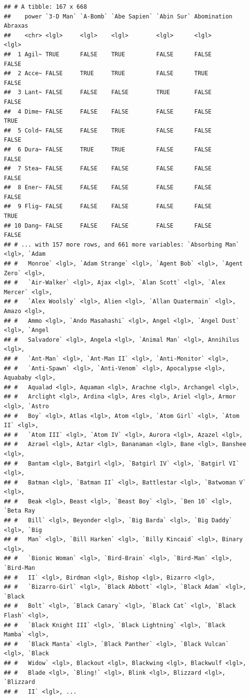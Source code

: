 \documentclass[]{book}
\begin{document}
\begin{verbatim}
## # A tibble: 167 x 668
##    power `3-D Man` `A-Bomb` `Abe Sapien` `Abin Sur` Abomination Abraxas
##    <chr> <lgl>     <lgl>    <lgl>        <lgl>      <lgl>       <lgl>  
##  1 Agil~ TRUE      FALSE    TRUE         FALSE      FALSE       FALSE  
##  2 Acce~ FALSE     TRUE     TRUE         FALSE      TRUE        FALSE  
##  3 Lant~ FALSE     FALSE    FALSE        TRUE       FALSE       FALSE  
##  4 Dime~ FALSE     FALSE    FALSE        FALSE      FALSE       TRUE   
##  5 Cold~ FALSE     FALSE    TRUE         FALSE      FALSE       FALSE  
##  6 Dura~ FALSE     TRUE     TRUE         FALSE      FALSE       FALSE  
##  7 Stea~ FALSE     FALSE    FALSE        FALSE      FALSE       FALSE  
##  8 Ener~ FALSE     FALSE    FALSE        FALSE      FALSE       FALSE  
##  9 Flig~ FALSE     FALSE    FALSE        FALSE      FALSE       TRUE   
## 10 Dang~ FALSE     FALSE    FALSE        FALSE      FALSE       FALSE  
## # ... with 157 more rows, and 661 more variables: `Absorbing Man` <lgl>, `Adam
## #   Monroe` <lgl>, `Adam Strange` <lgl>, `Agent Bob` <lgl>, `Agent Zero` <lgl>,
## #   `Air-Walker` <lgl>, Ajax <lgl>, `Alan Scott` <lgl>, `Alex Mercer` <lgl>,
## #   `Alex Woolsly` <lgl>, Alien <lgl>, `Allan Quatermain` <lgl>, Amazo <lgl>,
## #   Ammo <lgl>, `Ando Masahashi` <lgl>, Angel <lgl>, `Angel Dust` <lgl>, `Angel
## #   Salvadore` <lgl>, Angela <lgl>, `Animal Man` <lgl>, Annihilus <lgl>,
## #   `Ant-Man` <lgl>, `Ant-Man II` <lgl>, `Anti-Monitor` <lgl>,
## #   `Anti-Spawn` <lgl>, `Anti-Venom` <lgl>, Apocalypse <lgl>, Aquababy <lgl>,
## #   Aqualad <lgl>, Aquaman <lgl>, Arachne <lgl>, Archangel <lgl>,
## #   Arclight <lgl>, Ardina <lgl>, Ares <lgl>, Ariel <lgl>, Armor <lgl>, `Astro
## #   Boy` <lgl>, Atlas <lgl>, Atom <lgl>, `Atom Girl` <lgl>, `Atom II` <lgl>,
## #   `Atom III` <lgl>, `Atom IV` <lgl>, Aurora <lgl>, Azazel <lgl>,
## #   Azrael <lgl>, Aztar <lgl>, Bananaman <lgl>, Bane <lgl>, Banshee <lgl>,
## #   Bantam <lgl>, Batgirl <lgl>, `Batgirl IV` <lgl>, `Batgirl VI` <lgl>,
## #   Batman <lgl>, `Batman II` <lgl>, Battlestar <lgl>, `Batwoman V` <lgl>,
## #   Beak <lgl>, Beast <lgl>, `Beast Boy` <lgl>, `Ben 10` <lgl>, `Beta Ray
## #   Bill` <lgl>, Beyonder <lgl>, `Big Barda` <lgl>, `Big Daddy` <lgl>, `Big
## #   Man` <lgl>, `Bill Harken` <lgl>, `Billy Kincaid` <lgl>, Binary <lgl>,
## #   `Bionic Woman` <lgl>, `Bird-Brain` <lgl>, `Bird-Man` <lgl>, `Bird-Man
## #   II` <lgl>, Birdman <lgl>, Bishop <lgl>, Bizarro <lgl>,
## #   `Bizarro-Girl` <lgl>, `Black Abbott` <lgl>, `Black Adam` <lgl>, `Black
## #   Bolt` <lgl>, `Black Canary` <lgl>, `Black Cat` <lgl>, `Black Flash` <lgl>,
## #   `Black Knight III` <lgl>, `Black Lightning` <lgl>, `Black Mamba` <lgl>,
## #   `Black Manta` <lgl>, `Black Panther` <lgl>, `Black Vulcan` <lgl>, `Black
## #   Widow` <lgl>, Blackout <lgl>, Blackwing <lgl>, Blackwulf <lgl>,
## #   Blade <lgl>, `Bling!` <lgl>, Blink <lgl>, Blizzard <lgl>, `Blizzard
## #   II` <lgl>, ...
\end{verbatim}
\end{document}
